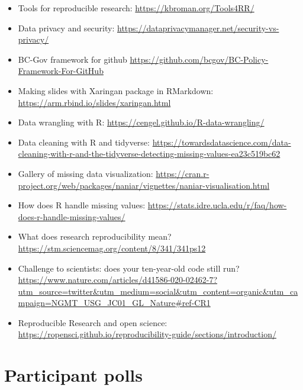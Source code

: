 \documentclass[
  12pt,
]{book}
\begin{document}
\begin{itemize}
\item
  Tools for reproducible research: \url{https://kbroman.org/Tools4RR/}
\item
  Data privacy and security: \url{https://dataprivacymanager.net/security-vs-privacy/}
\item
  BC-Gov framework for github \url{https://github.com/bcgov/BC-Policy-Framework-For-GitHub}
\item
  Making slides with Xaringan package in RMarkdown: \url{https://arm.rbind.io/slides/xaringan.html}
\item
  Data wrangling with R: \url{https://cengel.github.io/R-data-wrangling/}
\item
  Data cleaning with R and tidyverse: \url{https://towardsdatascience.com/data-cleaning-with-r-and-the-tidyverse-detecting-missing-values-ea23c519bc62}
\item
  Gallery of missing data visualization: \url{https://cran.r-project.org/web/packages/naniar/vignettes/naniar-visualisation.html}
\item
  How does R handle missing values: \url{https://stats.idre.ucla.edu/r/faq/how-does-r-handle-missing-values/}
\item
  What does research reproducibility mean? \url{https://stm.sciencemag.org/content/8/341/341ps12}
\item
  Challenge to scientists: does your ten-year-old code still run? \url{https://www.nature.com/articles/d41586-020-02462-7?utm_source=twitter\&utm_medium=social\&utm_content=organic\&utm_campaign=NGMT_USG_JC01_GL_Nature\#ref-CR1}
\item
  Reproducible Research and open science: \url{https://ropensci.github.io/reproducibility-guide/sections/introduction/}
\end{itemize}

\hypertarget{participant-polls}{%
\section{Participant polls}\label{participant-polls}}
\end{document}

